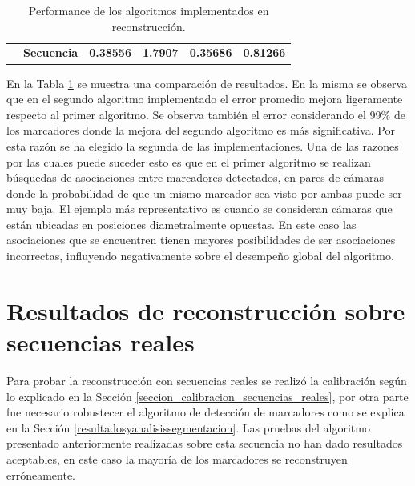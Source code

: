 \begin{table}[H]
{\begin{tabular}{cc|c|c|c|c|}
\multicolumn{1}{l|}{}                                                         & \textbf{Secuencia }                                            & \textbf{0.38556 }                                                         & \textbf{1.7907    }                                                    & \textbf{0.35686}                                                         &\textbf{ 0.81266}                                                       \\ \cline{2-6} 
\end{tabular}
}
\caption{Performance de los algoritmos implementados en reconstrucción. }
\label{table_performance_reconstruccion}
\end{table}

En la Tabla \ref{table_performance_reconstruccion} se muestra una comparación de resultados. En la misma se observa que en el segundo algoritmo implementado el error promedio mejora ligeramente respecto al primer algoritmo. Se observa también el error considerando el 99\% de los marcadores donde la mejora del segundo algoritmo es más significativa. Por esta razón se ha elegido la segunda de las implementaciones.
Una de las razones por las cuales puede suceder esto es que en el primer algoritmo se realizan búsquedas de asociaciones entre marcadores detectados, en pares de cámaras donde la probabilidad de que un mismo marcador sea visto por ambas puede ser muy baja. El ejemplo más representativo es cuando se consideran cámaras que están  ubicadas en posiciones diametralmente opuestas. En este caso las asociaciones que se encuentren tienen mayores posibilidades de ser asociaciones incorrectas, influyendo negativamente sobre el desempeño global del algoritmo. 



\section{Resultados de reconstrucción sobre secuencias reales}

Para probar la reconstrucción con secuencias reales se realizó la calibración según lo explicado en la Sección \ref{seccion_calibracion_secuencias_reales}, por otra parte fue necesario robustecer el algoritmo de detección de marcadores como se explica en la Sección \ref{resultadosyanalisissegmentacion}. Las pruebas del algoritmo presentado anteriormente realizadas sobre esta secuencia no han dado resultados aceptables, en este caso la mayoría de los marcadores se reconstruyen erróneamente. 


